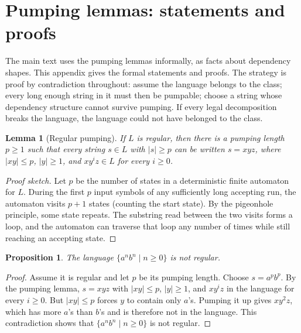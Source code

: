 \documentclass[11pt]{article}
\theoremstyle{definition}
\theoremstyle{plain}
\newtheorem{lemma}[theorem]{Lemma}
\newtheorem{proposition}[theorem]{Proposition}
\theoremstyle{remark}
\begin{document}



\appendix

\section{Pumping lemmas: statements and proofs}
\label{app:pumping}

The main text uses the pumping lemmas informally, as facts about dependency
shapes. This appendix gives the formal statements and proofs. The strategy is
proof by contradiction throughout: assume the language belongs to the class;
every long enough string in it must then be pumpable; choose a string whose
dependency structure cannot survive pumping. If every legal decomposition
breaks the language, the language could not have belonged to the class.

\begin{lemma}[Regular pumping]
If $L$ is regular, then there is a pumping length $p \ge 1$ such that every string
$s \in L$ with $|s| \ge p$ can be written $s=xyz$, where $|xy| \le p$, $|y| \ge 1$,
and $xy^iz \in L$ for every $i \ge 0$.
\end{lemma}

\begin{proof}[Proof sketch]
Let $p$ be the number of states in a deterministic finite automaton for $L$.
During the first $p$ input symbols of any sufficiently long accepting run, the
automaton visits $p+1$ states (counting the start state). By the pigeonhole
principle, some state repeats. The substring read between the two visits forms a
loop, and the automaton can traverse that loop any number of times while still
reaching an accepting state.
\end{proof}

\begin{proposition}
The language $\{a^n b^n \mid n \ge 0\}$ is not regular.
\end{proposition}

\begin{proof}
Assume it is regular and let $p$ be its pumping length. Choose $s=a^p b^p$.
By the pumping lemma, $s=xyz$ with $|xy|\le p$, $|y|\ge 1$, and $xy^iz$ in the
language for every $i\ge 0$. But $|xy|\le p$ forces $y$ to contain only $a$'s.
Pumping it up gives $xy^2z$, which has more $a$'s than $b$'s and is therefore
not in the language. This contradiction shows that $\{a^n b^n\mid n\ge 0\}$ is
not regular.
\end{proof}
\end{document}
